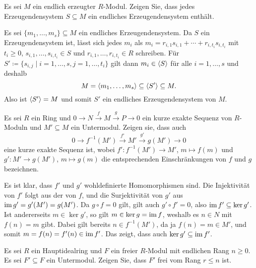 \begin{question}
  Es sei $M$ ein endlich erzeugter $R$-Modul.
  Zeigen Sie, dass jedes Erzeugendensystem $S \subseteq M$ ein endliches Erzeugendensystem enthält.
\end{question}


\begin{solution}
  Es sei $\{m_1, \dotsc, m_s\} \subseteq M$ ein endliches Erzeugendensystem.
  Da $S$ ein Erzeugendensystem ist, lässt sich jedes $m_i$ als $m_i = r_{i,1} s_{i,1} + \dotsb + r_{i,t_i} s_{i,t_i}$ mit $t_i \geq 0$, $s_{i,1}, \dotsc, s_{i,t_i} \in S$ und $r_{i,1}, \dotsc, r_{i,t_i} \in R$ schreiben.
  Für $S' \coloneqq \{s_{i,j} \mid i = 1, \dotsc, s, j = 1, \dotsc, t_i\}$ gilt dann $m_i \in \left\langle S \right\rangle$ für alle $i = 1, \dotsc, s$ und deshalb
  \[
              M
    =         \left\langle m_1, \dotsc, m_s \right\rangle
    \subseteq \left\langle S' \right\rangle
    \subseteq M.
  \]
  Also ist $\left\langle S' \right\rangle = M$ und somit $S'$ ein endliches Erzeugendensystem von $M$.
\end{solution}


\begin{question}
  \label{question: restriction of a short exact sequence to a submodule of its middle term}
  Es sei $R$ ein Ring und $0 \to N \xrightarrow{f} M \xrightarrow{g} P \to 0$ ein kurze exakte Sequenz von $R$-Moduln und $M' \subseteq M$ ein Untermodul.
  Zeigen sie, dass auch
  \[
    0 \to f^{-1}(M') \xrightarrow{f'} M' \xrightarrow{g'} g(M') \to 0
  \]
  eine kurze exakte Sequenz ist, wobei $f' \colon f^{-1}(M') \to M'$, $m \mapsto f(m)$ und $g' \colon M' \to g(M')$, $m \mapsto g(m)$ die entsprechenden Einschränkungen von $f$ und $g$ bezeichnen.
\end{question}


\begin{solution}
  Es ist klar, dass $f'$ und $g'$ wohldefinierte Homomorphismen sind.
  Die Injektivität von $f'$ folgt aus der von $f$, und die Surjektivität von $g'$ aus $\operatorname{im} g' = g'(M') = g(M')$.
  Da $g \circ f = 0$ gilt, gilt auch $g' \circ f' = 0$, also $\operatorname{im} f' \subseteq \ker g'$.
  Ist andererseits $m \in \ker g'$, so gilt $m \in \ker g = \operatorname{im} f$, weshalb es $n \in N$ mit $f(n) = m$ gibt.
  Dabei gilt bereits $n \in f^{-1}(M')$, da ja $f(n) = m \in M'$, und somit $m = f(n) = f'(n) \in \operatorname{im} f'$.
  Das zeigt, dass auch $\ker g' \subseteq \operatorname{im} f'$.
\end{solution}


\begin{question}
  \label{question: submodules of free modules over pid are also free}
  Es sei $R$ ein Hauptidealring und $F$ ein freier $R$-Modul mit endlichen Rang $n \geq 0$.
  Es sei $F' \subseteq F$ ein Untermodul.
  Zeigen Sie, dass $F'$ frei vom Rang $r \leq n$ ist.
\end{question}


